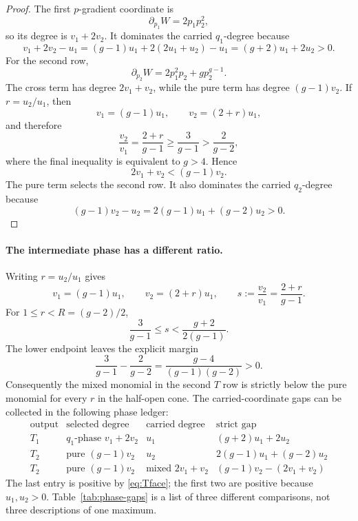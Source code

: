 \documentclass[11pt]{article}
\theoremstyle{remark}
\numberwithin{equation}{section}
\begin{document}
\begin{proof}
The first \(p\)-gradient coordinate is
\[
 \partial_{p_1}W=2p_1p_2^2,
\]
so its degree is \(v_1+2v_2\).  It dominates the carried \(q_1\)-degree because
\begin{equation}\label{eq:Tfirstgap}
 v_1+2v_2-u_1
 =(g-1)u_1+2(2u_1+u_2)-u_1
 =(g+2)u_1+2u_2>0.
\end{equation}
For the second row,
\[
 \partial_{p_2}W=2p_1^2p_2+gp_2^{g-1}.
\]
The cross term has degree \(2v_1+v_2\), while the pure term has degree
\((g-1)v_2\).  If \(r=u_2/u_1\), then
\[
 v_1=(g-1)u_1,\qquad v_2=(2+r)u_1,
\]
and therefore
\[
 \frac{v_2}{v_1}=\frac{2+r}{g-1}
 \geq\frac{3}{g-1}>\frac{2}{g-2},
\]
where the final inequality is equivalent to \(g>4\).  Hence
\begin{equation}\label{eq:Tface}
 2v_1+v_2<(g-1)v_2.
\end{equation}
The pure term selects the second row.  It also dominates the carried
\(q_2\)-degree because
\begin{equation}\label{eq:Tsecondgap}
 (g-1)v_2-u_2
 =2(g-1)u_1+(g-2)u_2>0.
\end{equation}
\end{proof}

\paragraph{The intermediate phase has a different ratio.}
Writing $r=u_2/u_1$ gives
\[
 v_1=(g-1)u_1,\qquad v_2=(2+r)u_1,\qquad
 s:=\frac{v_2}{v_1}=\frac{2+r}{g-1}.
\]
For $1\leq r<R=(g-2)/2$,
\[
 \frac{3}{g-1}\leq s<\frac{g+2}{2(g-1)}.
\]
The lower endpoint leaves the explicit margin
\[
 \frac{3}{g-1}-\frac{2}{g-2}
 =\frac{g-4}{(g-1)(g-2)}>0.
\tag{T-face-margin}\label{eq:T-face-margin}
\]
Consequently the mixed monomial in the second $T$ row is strictly below the
pure monomial for every $r$ in the half-open cone.  The carried-coordinate
gaps can be collected in the following phase ledger:
\[
\begin{array}{c|c|c|c}
\text{output}&\text{selected degree}&\text{carried degree}
 &\text{strict gap}\\
\hline
T_1&q_1\text{-phase }v_1+2v_2&u_1&(g+2)u_1+2u_2\\
T_2&\text{pure }(g-1)v_2&u_2&2(g-1)u_1+(g-2)u_2\\
T_2&\text{pure }(g-1)v_2&\text{mixed }2v_1+v_2
 &(g-1)v_2-(2v_1+v_2)
\end{array}
\tag{Phase gaps}\label{tab:phase-gaps}
\]
The last entry is positive by \eqref{eq:Tface}; the first two are positive
because $u_1,u_2>0$.  Table~\ref{tab:phase-gaps} is a list of three
different comparisons, not three descriptions of one maximum.
\end{document}
